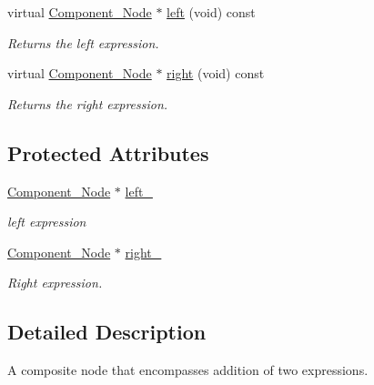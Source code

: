 \begin{DoxyCompactItemize}
virtual \hyperlink{classMadara_1_1Expression__Tree_1_1Component__Node}{Component\_\-Node} $\ast$ \hyperlink{classMadara_1_1Expression__Tree_1_1Composite__Binary__Node_a6ca5cccbc46ccc6026c18f9665298380}{left} (void) const 
\begin{DoxyCompactList}\small\item\em Returns the left expression. \item\end{DoxyCompactList}\item 
virtual \hyperlink{classMadara_1_1Expression__Tree_1_1Component__Node}{Component\_\-Node} $\ast$ \hyperlink{classMadara_1_1Expression__Tree_1_1Composite__Unary__Node_ade55cde5707e0fa73ab1c019159b9aec}{right} (void) const 
\begin{DoxyCompactList}\small\item\em Returns the right expression. \item\end{DoxyCompactList}\end{DoxyCompactItemize}
\subsection*{Protected Attributes}
\begin{DoxyCompactItemize}
\item 
\hyperlink{classMadara_1_1Expression__Tree_1_1Component__Node}{Component\_\-Node} $\ast$ \hyperlink{classMadara_1_1Expression__Tree_1_1Composite__Binary__Node_acac60a70beb2484737e6e7161edb2d1b}{left\_\-}
\begin{DoxyCompactList}\small\item\em left expression \item\end{DoxyCompactList}\item 
\hyperlink{classMadara_1_1Expression__Tree_1_1Component__Node}{Component\_\-Node} $\ast$ \hyperlink{classMadara_1_1Expression__Tree_1_1Composite__Unary__Node_a077b7bd1b52df6f5c6adfde735556a68}{right\_\-}
\begin{DoxyCompactList}\small\item\em Right expression. \item\end{DoxyCompactList}\end{DoxyCompactItemize}


\subsection{Detailed Description}
A composite node that encompasses addition of two expressions. 


